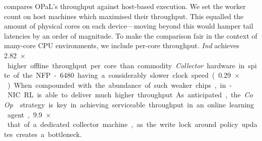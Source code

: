\documentclass[
sigconf,natbib=false
,anonymous=true
,10pt
]{acmart}
\newcommand{\approachshort}{OPaL}
\newcommand{\Coopfw}{\emph{CoOp}}
\newcommand{\Indfw}{\emph{Ind}}
\begin{document}

\newlength{\resultplotwidth}
\setlength{\resultplotwidth}{0.8\linewidth}

\begin{table}
	\caption{Latencies and computation times for \approachshort{} versus commodity hardware hosts. On-device execution is crucial in not only lowering latencies, but in reducing tail latencies. Lower is better, with the best marked \emph{in bold}.\label{tab:lats}}
\end{table}

\begin{table}
	\caption{Action and update throughputs for \approachshort{} versus commodity hardware hosts. Most designs cannot scale online performance with additional cores. Higher is better, with the best marked \emph{in bold}.\label{tab:tputs}}
\end{table}

 compares \approachshort{}'s throughput against host-based execution.
We set the worker count on host machines which maximised their throughput.
This equalled the amount of physical cores on each device---moving beyond this would hamper tail latencies by an order of magnitude.
To make the comparison fair in the context of many-core CPU environments, we include per-core throughput.
\Indfw{} achieves \SI{2.82}{$\times$} higher offline throughput per core than commodity \emph{Collector} hardware in spite of the NFP-6480 having a considerably slower clock speed (\SI{0.29}{$\times$}).
When compounded with the abundance of such weaker chips, in-NIC RL is able to deliver much higher throughput.
As anticipated, the \Coopfw{} strategy is key in achieving serviceable throughput in an online learning agent, \SI{9.9}{$\times$} that of a dedicated collector machine, as the write lock around policy updates creates a bottleneck.
\end{document}
